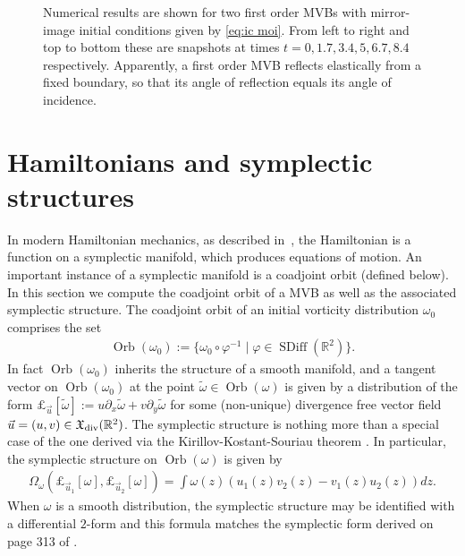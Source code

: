 \documentclass[12pt]{amsart}
\newcommand{\R}{\ensuremath{\mathbb{R}}}
\theoremstyle{remark}
\DeclareMathOperator{\SDiff}{SDiff}
\DeclareMathOperator{\Orb}{Orb}
\begin{document}
\begin{figure}[h!]
	\caption{Numerical results are shown for two first order MVBs with mirror-image initial conditions given by \eqref{eq:ic moi}.
		From left to right and top to bottom these are snapshots at times $t=0,1.7,3.4,5,6.7,8.4$ respectively. Apparently, a first order MVB reflects elastically from a fixed boundary, so that its angle of reflection equals its angle of incidence.}
	\label{fig:moi}
\end{figure}


\section{Hamiltonians and symplectic structures}
\label{sec:symplectic}
In modern Hamiltonian mechanics, as described in~\cite{FOM,Arnold2000},
the Hamiltonian is a function on a symplectic manifold, which produces equations of motion.
An important instance of a symplectic manifold is a coadjoint orbit (defined below).
In this section we compute the coadjoint orbit of a MVB
as well as the associated symplectic structure.
The coadjoint orbit of an initial vorticity distribution $\omega_0$ comprises the set
\begin{align*}
  \Orb(\omega_0) := \{ \omega_0 \circ \varphi^{-1} \mid \varphi \in \SDiff(\R^2) \}.
\end{align*}
In fact $\Orb(\omega_0)$ inherits the structure of a smooth manifold,
and a tangent vector on $\Orb(\omega_0)$ at the point $\tilde{\omega} \in \Orb(\omega)$ is given by 
a distribution of the form $\pounds_{\vec{u}}[\tilde{\omega}] := u \partial_x \tilde{\omega} + v \partial_y \tilde{\omega}$ for some (non-unique) divergence free vector field
$\vec{u} = (u,v) \in \mathfrak{X}_{\rm div}(\R^2)$.
The symplectic structure is nothing more than a special case of the one derived via the Kirillov-Kostant-Souriau theorem \cite[see the boxed formula on p.303]{FOM}.
In particular, the symplectic structure on $\Orb(\omega)$ is given by
\begin{align}
  \Omega_\omega( \pounds_{\vec{u}_1}[\omega] , \pounds_{\vec{u}_2}[\omega] ) = \int \omega(z)  ( u_1(z) v_2(z) - v_1(z) u_2(z) ) dz. \label{eq:symplectic}
\end{align}
When $\omega$ is a smooth distribution, the symplectic structure may be identified with a differential $2$-form and this formula matches the symplectic form derived on page 313 of \cite{MarsdenWeinstein1983}.
\end{document}
